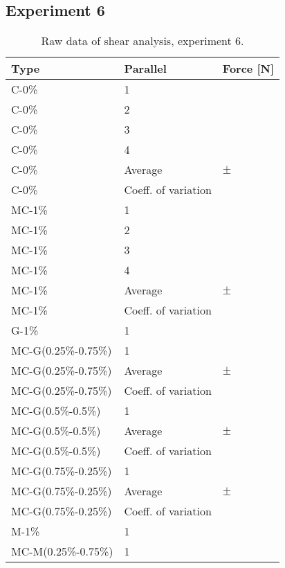 \subsection{Experiment 6}
\begin{table}[H]
    \caption{Raw data of shear analysis, experiment 6.}
    \centering
    \begin{tabular}{ll|l}
\toprule

\textbf{Type} & \textbf{Parallel}  & \textbf{Force [N]}\\

\hline
C-0\%       &    1      &  \\
C-0\%       &    2      &  \\
C-0\%       &    3      &  \\
C-0\%       &    4      &  \\
C-0\%       & Average   &  $\pm$ \\
C-0\%       & Coeff. of variation &  \\
\hline 
MC-1\%       &   1       &  \\
MC-1\%       &   2       &  \\
MC-1\%       &   3       &  \\
MC-1\%       &   4       &  \\
MC-1\%       & Average   &  $\pm$  \\
MC-1\%       & Coeff. of variation &  \\
\hline
G-1\%       &  1       &  \\
\hline
MC-G(0.25\%-0.75\%)       &  1       &  \\
MC-G(0.25\%-0.75\%)       & Average   &  $\pm$  \\
MC-G(0.25\%-0.75\%)       & Coeff. of variation &  \\
\hline
MC-G(0.5\%-0.5\%)       &  1       &  \\
MC-G(0.5\%-0.5\%)       & Average   &  $\pm$  \\
MC-G(0.5\%-0.5\%)       & Coeff. of variation &  \\
\hline
MC-G(0.75\%-0.25\%)       &  1       &  \\
MC-G(0.75\%-0.25\%)       & Average   &  $\pm$  \\
MC-G(0.75\%-0.25\%)       & Coeff. of variation &  \\
\hline
M-1\%       & 1         &   \\
\hline
MC-M(0.25\%-0.75\%)       &  1       &  \\

\end{tabular}
\end{table}
